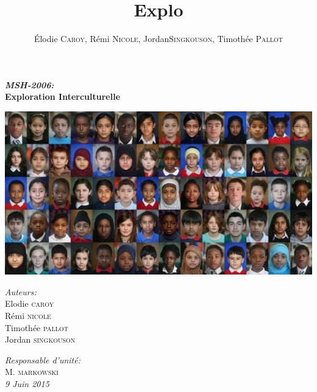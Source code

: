 \documentclass[12pt]{book}
\title{Explo}
\author{\'Elodie \textsc{Caroy}, Rémi \textsc{Nicole}, Jordan\textsc{Singkouson}, Timothée \textsc{Pallot}}
\date{}
\begin{document}
\begin{titlepage}
	\begin{sffamily}
	\begin{center}

	\vspace{\fill}
	{\huge \bfseries \emph{MSH-2006:}\\
	Exploration Interculturelle \\[0.4cm]}
	\vspace{\fill}
	
	\includegraphics[scale=0.8]{races-620x330.jpg}
	\newline
	
    \begin{minipage}{0.4\textwidth}
      \begin{flushleft} \large
				\emph{Auteurs:}\\
        Elodie \textsc{caroy}\\
				Rémi \textsc{nicole}\\
				Timothée \textsc{pallot}\\
				Jordan \textsc{singkouson}
      \end{flushleft}
    \end{minipage}
    \begin{minipage}{0.4\textwidth}
      \begin{flushright} \large
        \emph{Responsable d'unité:}\\
				M. \textsc{markowski}\\
				
				\emph{9 Juin 2015}
      \end{flushright}
    \end{minipage} 
	\end{center}
	\end{sffamily}
\end{titlepage}
	

\tableofcontents









\end{document}
